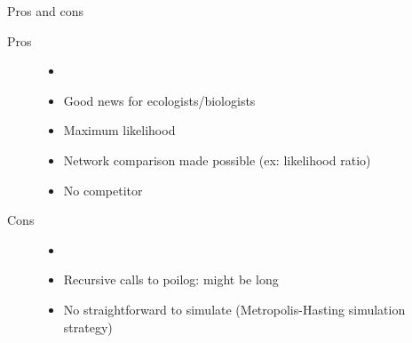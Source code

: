 \documentclass[9pt]{beamer}
\begin{document}
\begin{frame}{Pros and cons}
\begin{description}
	\item[Pros]
	\begin{itemize}
		\item[]
		\item Good news for ecologists/biologists
		\item Maximum likelihood
		\item Network comparison made possible (ex: likelihood ratio)
		\item No competitor
	\end{itemize}
    
	\item[Cons] 
	\begin{itemize}
		\item[]
		\item Recursive calls to poilog: might be long
		\item No straightforward to simulate (Metropolis-Hasting simulation strategy)
	\end{itemize}
	
\end{description}
	

\end{frame}
\end{document}
